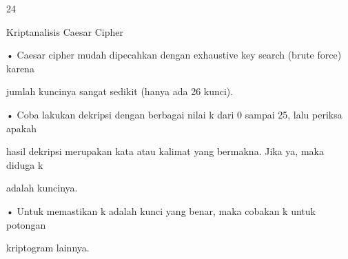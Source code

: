 \documentclass{article}
\begin{document}

24

Kriptanalisis Caesar Cipher

• Caesar cipher mudah dipecahkan dengan exhaustive key search  (brute force) karena 

jumlah kuncinya sangat sedikit (hanya ada 26 kunci).

• Coba lakukan dekripsi dengan berbagai nilai k dari 0 sampai 25, lalu periksa apakah 

hasil dekripsi merupakan kata atau kalimat yang bermakna. Jika ya, maka diduga k 

adalah kuncinya.

• Untuk memastikan k adalah kunci yang benar, maka cobakan k untuk potongan 

kriptogram lainnya.
\end{document}
